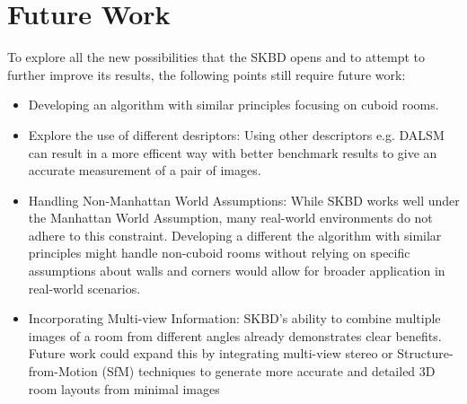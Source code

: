 \section{Future Work}
\label{sec:futurework}
To explore all the new possibilities that the SKBD opens and to attempt to further improve its results, the following points still require future work:
\begin{itemize}
  \item Developing an algorithm with similar principles focusing on cuboid rooms.
  \item Explore the use of different desriptors: Using other descriptors e.g. DALSM can result in a more efficent way with better benchmark results to give an accurate measurement of a pair of images.
  \item {Handling Non-Manhattan World Assumptions:} While SKBD works well under the Manhattan World Assumption, many real-world environments do not adhere to this constraint. Developing a different the algorithm with similar principles might handle non-cuboid rooms without relying on specific assumptions about walls and corners would allow for broader application in real-world scenarios.
  \item Incorporating Multi-view Information: SKBD's ability to combine multiple images of a room from different angles already demonstrates clear benefits. Future work could expand this by integrating multi-view stereo or Structure-from-Motion (SfM) techniques to generate more accurate and detailed 3D room layouts from minimal images
\end{itemize}
